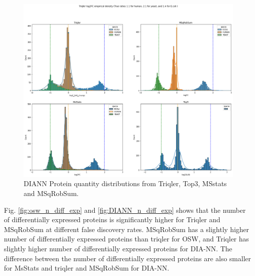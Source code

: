 \documentclass[10pt,letterpaper]{article}
\begin{document}
\begin{figure}[H]
    \centering
    \includegraphics[width=16cm]{../../result/2021-08-13_docs_plots/DIANN_intensity_plot.png}
    \caption{DIANN Protein quantity distributions from Triqler, Top3, MSstats and MSqRobSum.}
    \label{fig:DIANN_intensity_distribution}
\end{figure}


Fig. \ref{fig:osw_n_diff_exp} and \ref{fig:DIANN_n_diff_exp} shows that the number of differentially expressed proteins is significantly higher for Triqler and MSqRobSum at different false discovery rates. MSqRobSum has a slightly higher number of differentially expressed proteins than triqler for OSW, and Triqler has slightly higher number of differentially expressed proteins for DIA-NN. The difference between the number of differentially expressed proteins are also smaller for MsStats and triqler and MSqRobSum for DIA-NN. 
\end{document}
